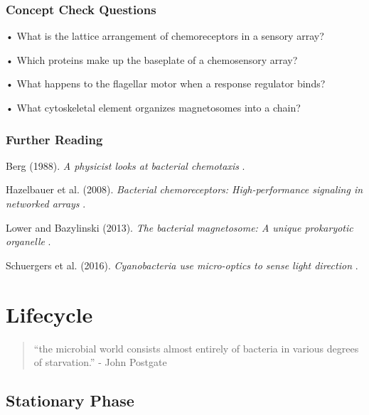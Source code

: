 \documentclass[]{tufte-book}
\begin{document}
\hypertarget{concept-check-questions-6}{%
\subsection*{Concept Check Questions}\label{concept-check-questions-6}}

• What is the lattice arrangement of chemoreceptors in a sensory array?

• Which proteins make up the baseplate of a chemosensory array?

• What happens to the flagellar motor when a response regulator binds?

• What cytoskeletal element organizes magnetosomes into a chain?

\hypertarget{further-reading-6}{%
\subsection*{Further Reading}\label{further-reading-6}}

Berg (1988). \emph{A physicist looks at bacterial chemotaxis} \citep{berg1988}.

Hazelbauer et al. (2008). \emph{Bacterial chemoreceptors: High-performance signaling in networked arrays} \citep{hazelbauer2008}.

Lower and Bazylinski (2013). \emph{The bacterial magnetosome: A unique prokaryotic organelle} \citep{lower2013}.

Schuergers et al. (2016). \emph{Cyanobacteria use micro-optics to sense light direction} \citep{schuergers2016}.

\hypertarget{lifecycle}{%
\chapter{Lifecycle}\label{lifecycle}}

\begin{quote}
``the microbial world consists almost entirely of bacteria in various degrees of starvation.''
- John Postgate \citep{postgate1994}
\end{quote}

\hypertarget{stationary-phase}{%
\section{Stationary Phase}\label{stationary-phase}}
\end{document}
